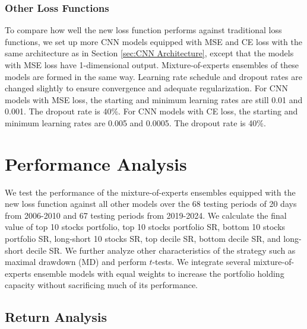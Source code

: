\documentclass[preprint,12pt,numafflabel,authoryear]{elsarticle}
\begin{document}
\subsubsection{Other Loss Functions}
\label{sec:Other Loss Functions}

To compare how well the new loss function performs against traditional loss functions, we set up more CNN models equipped with MSE and CE loss with the same architecture as in Section \ref{sec:CNN Architecture}, except that the models with MSE loss have 1-dimensional output. Mixture-of-experts ensembles of these models are formed in the same way. Learning rate schedule and dropout rates are changed slightly to ensure convergence and adequate regularization. For CNN models with MSE loss, the starting and minimum learning rates are still 0.01 and 0.001. The dropout rate is 40\%. For CNN models with CE loss, the starting and minimum learning rates are 0.005 and 0.0005. The dropout rate is 40\%.

\section{Performance Analysis}
\label{sec:Performance Analysis}

We test the performance of the mixture-of-experts ensembles equipped with the new loss function against all other models over the 68 testing periods of 20 days from 2006-2010 and 67 testing periods from 2019-2024. We calculate the final value of top 10 stocks portfolio, top 10 stocks portfolio SR, bottom 10 stocks portfolio SR, long-short 10 stocks SR, top decile SR, bottom decile SR, and long-short decile SR. We further analyze other characteristics of the strategy such as maximal drawdown (MD) and perform $t$-tests. We integrate several mixture-of-experts ensemble models with equal weights to increase the portfolio holding capacity without sacrificing much of its performance.

\subsection{Return Analysis}
\label{sec:Return Analysis}
\end{document}
